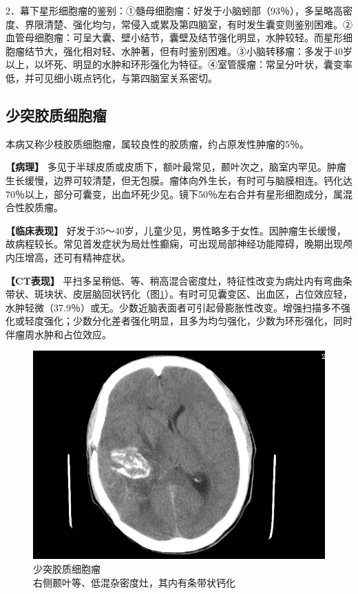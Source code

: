 2．幕下星形细胞瘤的鉴别：①髓母细胞瘤：好发于小脑蚓部（93％），多呈略高密度、界限清楚、强化均匀，常侵入或累及第四脑室，有时发生囊变则鉴别困难。②血管母细胞瘤：可呈大囊、壁小结节，囊壁及结节强化明显，水肿较轻。而星形细胞瘤结节大，强化相对轻、水肿著，但有时鉴别困难。③小脑转移瘤：多发于40岁以上，以坏死、明显的水肿和环形强化为特征。④室管膜瘤：常呈分叶状，囊变率低，并可见细小斑点钙化，与第四脑室关系密切。

\subsection{少突胶质细胞瘤}

本病又称少枝胶质细胞瘤，属较良性的胶质瘤，约占原发性肿瘤的5％。

\textbf{【病理】}
多见于半球皮质或皮质下，额叶最常见，颞叶次之，脑室内罕见。肿瘤生长缓慢，边界可较清楚，但无包膜。瘤体向外生长，有时可与脑膜相连。钙化达70％以上，部分可囊变，出血坏死少见。镜下50％左右合并有星形细胞成分，属混合性胶质瘤。

\textbf{【临床表现】}
好发于35～40岁，儿童少见，男性略多于女性。因肿瘤生长缓慢，故病程较长。常见首发症状为局灶性癫痫，可出现局部神经功能障碍，晚期出现颅内压增高，还可有精神症状。

\textbf{【CT表现】}
平扫多呈稍低、等、稍高混合密度灶，特征性改变为病灶内有弯曲条带状、斑块状、皮层脑回状钙化（图\ref{fig2-41}）。有时可见囊变区、出血区，占位效应轻，水肿轻微（37.9％）或无。少数近脑表面者可引起骨膨胀性改变。增强扫描多不强化或轻度强化；少数分化差者强化明显，且多为均匀强化，少数为环形强化，同时伴瘤周水肿和占位效应。

\begin{figure}[!htbp]
 \centering
 \includegraphics[width=.7\textwidth,height=\textheight,keepaspectratio]{./images/Image00069.jpg}
 \captionsetup{justification=centering}
 \caption{少突胶质细胞瘤\\{\small 右侧颞叶等、低混杂密度灶，其内有条带状钙化}}
 \label{fig2-41}
  \end{figure} 

